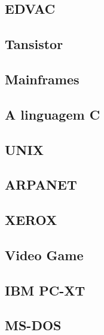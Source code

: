	\subsection[EDVAC]{EDVAC}

	
	\subsection[Tansistor]{Tansistor}

	
	\subsection[Mainframes]{Mainframes}

	
	\subsection[A linguagem C]{A linguagem C}

	
	\subsection[UNIX]{UNIX}

	
	\subsection[ARPANET]{ARPANET}

	
\subsection[XEROX]{XEROX}

	
	\subsection[Video Game]{Video Game}


	\subsection[IBM PC-XT]{IBM PC-XT}


	\subsection[MS-DOS]{MS-DOS}

	
